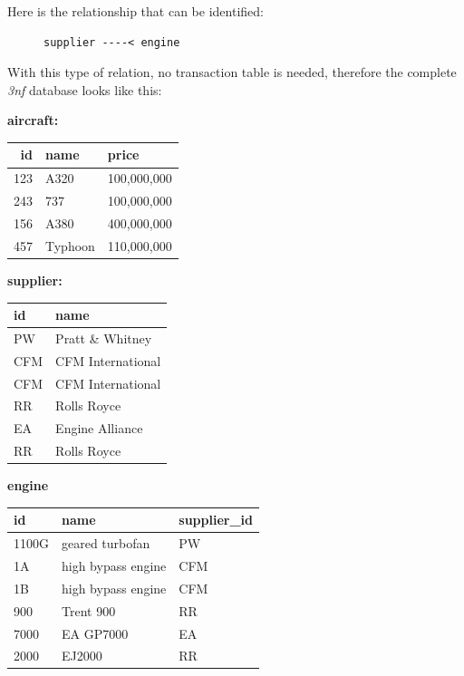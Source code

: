 \documentclass[10pt]{article}
\begin{document}
Here is the relationship that can be identified:

\begin{figure}[H]
\begin{verbatim}
supplier ----< engine
\end{verbatim}
\end{figure}

With this type of relation, no transaction table is needed, therefore the complete \emph{3nf} database looks like this:

\textbf{aircraft:}

\begin{center}
\begin{tabular}{rll}
\hline
id & name & price\\
\hline
123 & A320 & 100,000,000\\
243 & 737 & 100,000,000\\
156 & A380 & 400,000,000\\
457 & Typhoon & 110,000,000\\
\hline
\end{tabular}
\end{center}

\textbf{supplier:}

\begin{center}
\begin{tabular}{ll}
\hline
id & name\\
\hline
PW & Pratt \& Whitney\\
CFM & CFM International\\
CFM & CFM International\\
RR & Rolls Royce\\
EA & Engine Alliance\\
RR & Rolls Royce\\
\hline
\end{tabular}
\end{center}

\textbf{engine}

\begin{center}
\begin{tabular}{lll}
\hline
id & name & supplier\_id\\
\hline
1100G & geared turbofan & PW\\
1A & high bypass engine & CFM\\
1B & high bypass engine & CFM\\
900 & Trent 900 & RR\\
7000 & EA GP7000 & EA\\
2000 & EJ2000 & RR\\
\hline
\end{tabular}
\end{center}
\end{document}
